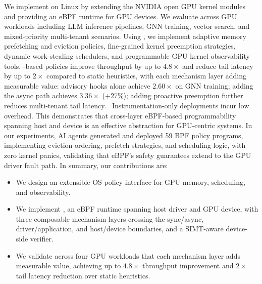We implement \sys{} on Linux by extending the NVIDIA open GPU kernel modules~\cite{nvidia-open-gpu} and providing an eBPF runtime for GPU devices. We evaluate \sys across GPU workloads including LLM inference pipelines, GNN training, vector search, and mixed-priority multi-tenant scenarios. Using \sys, we implement adaptive memory prefetching and eviction policies, fine-grained kernel preemption strategies, dynamic work-stealing schedulers, and programmable GPU kernel observability tools. \sys-based policies improve throughput by up to $4.8\times$ and reduce tail latency by up to $2\times$ compared to static heuristics, with each mechanism layer adding measurable value: advisory hooks alone achieve $2.60\times$ on GNN training; adding the async path achieves $3.36\times$ (+27\%); adding proactive preemption further reduces multi-tenant tail latency.~ Instrumentation-only deployments incur low overhead. This demonstrates that cross-layer eBPF-based programmability spanning host and device is an effective abstraction for GPU-centric systems. In our experiments, AI agents generated and deployed 59 BPF policy programs, implementing eviction ordering, prefetch strategies, and scheduling logic, with zero kernel panics, validating that eBPF's safety guarantees extend to the GPU driver fault path. In summary, our contributions are:

\begin{itemize}[leftmargin=*,itemsep=0pt]
  \item We design an extensible OS policy interface for GPU memory, scheduling, and observability.

  \item We implement \sys, an eBPF runtime spanning host driver and GPU device, with three composable mechanism layers crossing the sync/async, driver/application, and host/device boundaries, and a SIMT-aware device-side verifier.

  \item We validate across four GPU workloads that each mechanism layer adds measurable value, achieving up to $4.8\times$ throughput improvement and $2\times$ tail latency reduction over static heuristics.
\end{itemize}

